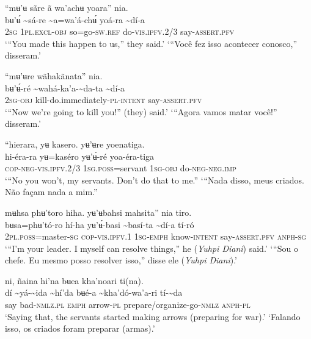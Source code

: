 \documentclass[output=paper,
modfonts,nonflat
]{langsci/langscibook}
\begin{document}
\ea “mʉ'ʉ sãre ã wa'achʉ yoara” nia.\\[.3em]
\gll {\textasciitilde}bʉ'ʉ́	{\textasciitilde}sá-re	{\textasciitilde}a=wa'á-chʉ́	yoá-ra	{\textasciitilde}dí-a\\
     2\textsc{sg}	1\textsc{pl.excl-obj}	so=go-\textsc{sw.ref}	do-\textsc{vis.ipfv.}2/3	say-\textsc{assert.pfv}\\
\glt ‘“You made this happen to us,” they said.’
\glt ‘“Você fez isso acontecer conosco,” disseram.’
\z 

\ea “mʉ'ʉre wãhakãnata” nia.\\[.3em]
\gll {\textasciitilde}bʉ'ʉ́-ré	{\textasciitilde}wahá-ka’a-{\textasciitilde}da-ta	{\textasciitilde}dí-a\\
     2\textsc{sg-obj}	kill-do.immediately-\textsc{pl-intent}	say-\textsc{assert.pfv}\\
\glt ‘“Now we're going to kill you!” (they) said.’
\glt ‘“Agora vamos matar você!” disseram.’ 
\z

\ea “hierara, yʉ kasero. yʉ’ʉre yoenatiga.\\[.3em]
\gll hi-éra-ra	yʉ=kaséro{\footnotemark}	yʉ’ʉ́-ré	yoa-éra-tiga\\
     \textsc{cop-neg-vis.ipfv.}2/3	1\textsc{sg.poss}=servant	1\textsc{sg-obj}	do\textsc{-neg-neg.imp}\\
\glt ‘“No you won't, my servants. Don’t do that to me.” 
\glt ‘“Nada disso, meus criados. Não façam nada a mim.”
\z 


\ea mʉhsa phʉ'toro hiha. yʉ’ʉbahsi mahsita” nia tiro.\\[.3em]
\gll {\textasciitilde}bʉsa=phʉ'tó-ro	hí-ha	yʉ’ʉ́-basi	{\textasciitilde}basí{\footnotemark}-ta	{\textasciitilde}dí-a tí-ró\\
     2\textsc{pl.poss}=master\textsc{-sg}	\textsc{cop-vis.ipfv.}1	1\textsc{sg-emph}	know-\textsc{intent}	say-\textsc{assert.pfv}	\textsc{anph-sg}\\
\glt ‘“I'm your leader. I myself can resolve things,” he (\textit{Yuhpi Diani}) said.’
\glt ‘“Sou o chefe. Eu mesmo posso resolver isso,” disse ele (\textit{Yuhpi Diani}).’
\z 

\ea ni, ñaina hi'na bʉea kha'noari ti(na).\\[.3em]
\gll {\textasciitilde}dí	{\textasciitilde}yá-{\textasciitilde}ida	{\textasciitilde}hí'da	bʉé-a	{\textasciitilde}kha'dó-wa'a-ri	tí-{\textasciitilde}da\\
     say	bad-\textsc{nmlz.pl}	\textsc{emph}	arrow-\textsc{pl}	prepare/organize-go-\textsc{nmlz}	\textsc{anph-pl}\\
\glt ‘Saying that, the servants started making arrows (preparing for war).’ 
\glt ‘Falando isso, os criados foram preparar (armas).’
\z 
\end{document}
